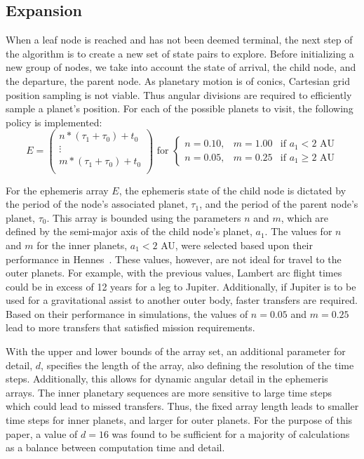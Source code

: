 \documentclass[letterpaper, preprint, paper,11pt]{AAS}	%
\begin{document}
\subsection{Expansion}
When a leaf node is reached and has not been deemed terminal, the next step of the algorithm is to create a new set of state pairs to explore. Before initializing a new group of nodes, we take into account the state of arrival, the child node, and the departure, the parent node. As planetary motion is of conics, Cartesian grid position sampling is not viable. Thus angular divisions are required to efficiently sample a planet's position. For each of the possible planets to visit, the following policy is implemented:
\begin{equation*}
    \label{eq:ephemArray}
    E =
    \left(\begin{array}{c}
        n*(\tau_1 + \tau_0) + t_0 \\
        \vdots \\
        m*(\tau_1 + \tau_0) + t_0 \\
    \end{array}\right)
    \text{ for }
    \left\{\begin{array}{lll}
        n = 0.10, & m = 1.00 &\text{if } a_1 < 2 \text{ AU} \\
        n = 0.05, & m = 0.25 &\text{if } a_1 \geq 2 \text{ AU}
    \end{array}\right.
\end{equation*}

For the ephemeris array $E$, the ephemeris state of the child node is dictated by the period of the node's associated planet, $\tau_1$, and the period of the parent node's planet, $\tau_0$. This array is bounded using the parameters $n$ and $m$, which are defined by the semi-major axis of the child node's planet, $a_1$. The values for $n$ and $m$ for the inner planets, $a_1 < 2$ AU, were selected based upon their performance in Hennes~\cite{Hennes2015}. These values, however, are not ideal for travel to the outer planets. For example, with the previous values, Lambert arc flight times could be in excess of 12 years for a leg to Jupiter. Additionally, if Jupiter is to be used for a gravitational assist to another outer body, faster transfers are required. Based on their performance in simulations, the values of $n = 0.05$ and $m = 0.25$ lead to more transfers that satisfied mission requirements.

With the upper and lower bounds of the array set, an additional parameter for detail, $d$, specifies the length of the array, also defining the resolution of the time steps. Additionally, this allows for dynamic angular detail in the ephemeris arrays. The inner planetary sequences are more sensitive to large time steps which could lead to missed transfers. Thus, the fixed array length leads to smaller time steps for inner planets, and larger for outer planets. For the purpose of this paper, a value of $d = 16$ was found to be sufficient for a majority of calculations as a balance between computation time and detail.
\end{document}
